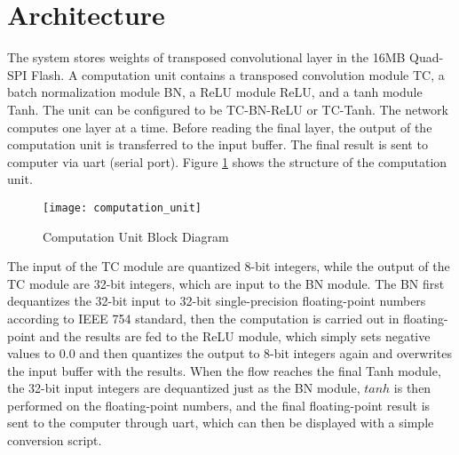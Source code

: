 \section{Architecture}

The system stores weights of transposed convolutional layer in the 16MB Quad-SPI Flash. A computation unit
contains a transposed convolution module TC, a batch normalization module BN, a ReLU module ReLU,
and a tanh module Tanh. The unit can be configured to be TC-BN-ReLU or TC-Tanh. The network computes one
layer at a time. Before reading the final layer, the output of the computation unit is transferred to the
input buffer. The final result is sent to computer via \gls{uart} (serial port). Figure
\ref{fig:computation_unit} shows the structure of the computation unit.

\begin{figure}[h]
  \centering
  \texttt{[image: computation\_unit]}
  \caption{Computation Unit Block Diagram}
  \label{fig:computation_unit}
\end{figure}

The input of the TC module are quantized 8-bit integers, while the output of the TC module are 32-bit
integers, which are input to the BN module. The BN first dequantizes the 32-bit input to 32-bit
single-precision floating-point numbers according to IEEE 754 standard, then the computation is carried
out in floating-point and the results are fed to the ReLU module, which simply sets negative values to
$0.0$ and then quantizes the output to 8-bit integers again and overwrites the input buffer with the
results. When the flow reaches the final Tanh module, the 32-bit input integers are dequantized just as the
BN module, $tanh$ is then performed on the floating-point numbers, and the final floating-point result is
sent to the computer through \gls{uart}, which can then be displayed with a simple conversion script.

\clearpage %
